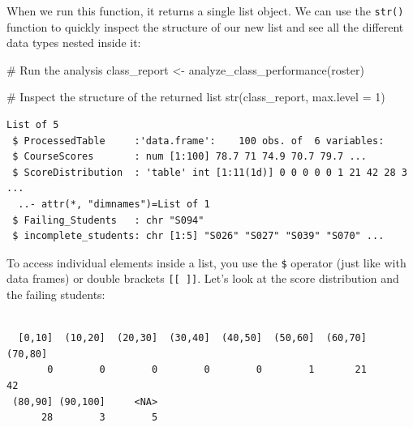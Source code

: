 \documentclass[
  letterpaper,
  DIV=11,
  numbers=noendperiod]{scrreprt}
\newenvironment{Shaded}{\begin{snugshade}}{\end{snugshade}}
\newcommand{\AttributeTok}[1]{\textcolor[rgb]{0.40,0.45,0.13}{#1}}
\newcommand{\CommentTok}[1]{\textcolor[rgb]{0.37,0.37,0.37}{#1}}
\newcommand{\DecValTok}[1]{\textcolor[rgb]{0.68,0.00,0.00}{#1}}
\newcommand{\FunctionTok}[1]{\textcolor[rgb]{0.28,0.35,0.67}{#1}}
\newcommand{\NormalTok}[1]{\textcolor[rgb]{0.00,0.23,0.31}{#1}}
\newcommand{\OtherTok}[1]{\textcolor[rgb]{0.00,0.23,0.31}{#1}}
\newcommand{\SpecialCharTok}[1]{\textcolor[rgb]{0.37,0.37,0.37}{#1}}
\begin{document}
When we run this function, it returns a single list object. We can use
the \texttt{str()} function to quickly inspect the structure of our new
list and see all the different data types nested inside it:

\begin{Shaded}
\begin{Highlighting}[]
\CommentTok{\# Run the analysis}
\NormalTok{class\_report }\OtherTok{\textless{}{-}} \FunctionTok{analyze\_class\_performance}\NormalTok{(roster)}

\CommentTok{\# Inspect the structure of the returned list}
\FunctionTok{str}\NormalTok{(class\_report, }\AttributeTok{max.level =} \DecValTok{1}\NormalTok{)}
\end{Highlighting}
\end{Shaded}

\begin{verbatim}
List of 5
 $ ProcessedTable     :'data.frame':    100 obs. of  6 variables:
 $ CourseScores       : num [1:100] 78.7 71 74.9 70.7 79.7 ...
 $ ScoreDistribution  : 'table' int [1:11(1d)] 0 0 0 0 0 1 21 42 28 3 ...
  ..- attr(*, "dimnames")=List of 1
 $ Failing_Students   : chr "S094"
 $ incomplete_students: chr [1:5] "S026" "S027" "S039" "S070" ...
\end{verbatim}

To access individual elements inside a list, you use the \texttt{\$}
operator (just like with data frames) or double brackets
\texttt{{[}{[}\ {]}{]}}. Let's look at the score distribution and the
failing students:

\begin{Shaded}
\end{Shaded}

\begin{verbatim}

  [0,10]  (10,20]  (20,30]  (30,40]  (40,50]  (50,60]  (60,70]  (70,80] 
       0        0        0        0        0        1       21       42 
 (80,90] (90,100]     <NA> 
      28        3        5 
\end{verbatim}

\begin{Shaded}
\end{Shaded}
\end{document}
